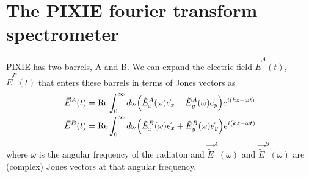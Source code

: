 \documentclass{article}
\renewcommand{\Re}{\operatorname{Re}}
\newcommand{\J}{{\tilde E}}
\begin{document}
\section{The PIXIE fourier transform spectrometer}
PIXIE has two barrels, A and B. We can expand the electric field $\vec E^A(t)$,
$\vec E^B(t)$ that enters these barrels in terms of Jones vectors as
\begin{align}
	\vec E^A(t) &= \Re \int_0^\infty d\omega \Big(\J^A_x(\omega)\vec e_x +
		\J^A_y(\omega)\vec e_y\Big) e^{i(kz-\omega t)} \notag \\
	\vec E^B(t) &= \Re \int_0^\infty d\omega \Big(\J^B_x(\omega)\vec e_x +
		\J^B_y(\omega)\vec e_y\Big) e^{i(kz-\omega t)}
\end{align}
where $\omega$ is the angular frequency of the radiaton and $\vec \J^A(\omega)$
and $\vec \J^B(\omega)$ are (complex) Jones vectors at that
angular frequency.
\end{document}
